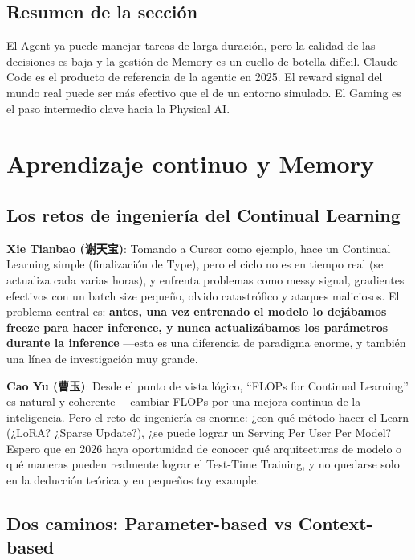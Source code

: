 \documentclass[a4paper]{article}
\begin{document}
\subsection{Resumen de la sección}
El Agent ya puede manejar tareas de larga duración, pero la calidad de las decisiones es baja y la gestión de Memory es un cuello de botella difícil. Claude Code es el producto de referencia de la agentic en 2025. El reward signal del mundo real puede ser más efectivo que el de un entorno simulado. El Gaming es el paso intermedio clave hacia la Physical AI.

\section{Aprendizaje continuo y Memory}

\subsection{Los retos de ingeniería del Continual Learning}

\textbf{Xie Tianbao (谢天宝)}: Tomando a Cursor como ejemplo, hace un Continual Learning simple (finalización de Type), pero el ciclo no es en tiempo real (se actualiza cada varias horas), y enfrenta problemas como messy signal, gradientes efectivos con un batch size pequeño, olvido catastrófico y ataques maliciosos. El problema central es: \textbf{antes, una vez entrenado el modelo lo dejábamos freeze para hacer inference, y nunca actualizábamos los parámetros durante la inference} —esta es una diferencia de paradigma enorme, y también una línea de investigación muy grande.

\textbf{Cao Yu (曹玉)}: Desde el punto de vista lógico, ``FLOPs for Continual Learning'' es natural y coherente —cambiar FLOPs por una mejora continua de la inteligencia. Pero el reto de ingeniería es enorme: ¿con qué método hacer el Learn (¿LoRA? ¿Sparse Update?), ¿se puede lograr un Serving Per User Per Model? Espero que en 2026 haya oportunidad de conocer qué arquitecturas de modelo o qué maneras pueden realmente lograr el Test-Time Training, y no quedarse solo en la deducción teórica y en pequeños toy example.

\subsection{Dos caminos: Parameter-based vs Context-based}
\end{document}
